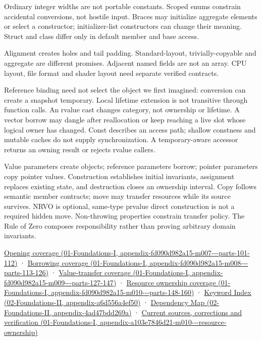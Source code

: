 Ordinary integer widths are not portable constants. Scoped enums constrain accidental conversions, not hostile input. Braces may initialize aggregate elements or select a constructor; initializer-list constructors can change their meaning. Struct and class differ only in default member and base access.

Alignment creates holes and tail padding. Standard-layout, trivially-copyable and aggregate are different promises. Adjacent named fields are not an array. CPU layout, file format and shader layout need separate verified contracts.

Reference binding need not select the object we first imagined: conversion can create a snapshot temporary. Local lifetime extension is not transitive through function calls. An rvalue cast changes category, not ownership or lifetime. A vector borrow may dangle after reallocation or keep reaching a live slot whose logical owner has changed. Const describes an access path; shallow constness and mutable caches do not supply synchronization. A temporary-aware accessor returns an owning result or rejects rvalue callers.

Value parameters create objects; reference parameters borrow; pointer parameters copy pointer values. Construction establishes initial invariants, assignment replaces existing state, and destruction closes an ownership interval. Copy follows semantic member contracts; move may transfer resources while its source survives. NRVO is optional, same-type prvalue direct construction is not a required hidden move. Non-throwing properties constrain transfer policy. The Rule of Zero composes responsibility rather than proving arbitrary domain invariants.

\href{../01-Foundations-I/main.pdf\#nameddest=appendix-fd090d982a15-m007---parts-101-112}{Opening coverage (01-Foundations-I, appendix-fd090d982a15-m007-\/-\/-parts-101-112)} · \href{../01-Foundations-I/main.pdf\#nameddest=appendix-fd090d982a15-m008---parts-113-126}{Borrowing coverage (01-Foundations-I, appendix-fd090d982a15-m008-\/-\/-parts-113-126)} · \href{../01-Foundations-I/main.pdf\#nameddest=appendix-fd090d982a15-m009---parts-127-147}{Value-transfer coverage (01-Foundations-I, appendix-fd090d982a15-m009-\/-\/-parts-127-147)} · \href{../01-Foundations-I/main.pdf\#nameddest=appendix-fd090d982a15-m010---parts-148-160}{Resource ownership coverage (01-Foundations-I, appendix-fd090d982a15-m010-\/-\/-parts-148-160)} · \href{../02-Foundations-II/main.pdf\#nameddest=appendix-a6d556a4ef50}{Keyword Index (02-Foundations-II, appendix-a6d556a4ef50)} · \href{../02-Foundations-II/main.pdf\#nameddest=appendix-4ad47bdd269a}{Dependency Map (02-Foundations-II, appendix-4ad47bdd269a)} · \href{../01-Foundations-I/main.pdf\#nameddest=appendix-a103e7846d21-m010---resource-ownership}{Current sources, corrections and verification (01-Foundations-I, appendix-a103e7846d21-m010-\/-\/-resource-ownership)}

